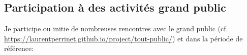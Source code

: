 \documentclass[10pt,french,a4paper]{article}%
\begin{document}
\begin{itemize}





\end{itemize} %
	

\subsection{Participation à des activités grand public} %

Je participe ou initie de nombreuses rencontres avec le grand public (cf. \url{https://laurentperrinet.github.io/project/tout-public/}) et dans la période de référence:
\end{document}
